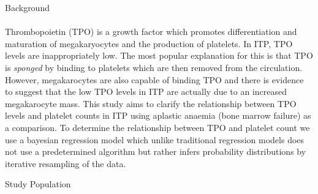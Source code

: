 \documentclass[landscape,a0paper,fontscale=0.285]{beamer} %
\newlength{\onecolwid}
\begin{document}
\begin{frame}[t]
\begin{columns}[t]
\begin{column}{\onecolwid}
\begin{alertblock}{Background}
\paragraph{} Thrombopoietin (TPO) is a growth factor which promotes differentiation and maturation of megakaryocytes and the production of platelets.
In ITP, TPO levels are inappropriately low. The most popular explanation for this is that TPO is \emph{sponged} by binding to platelets which are then removed from the circulation\cite{Kuterreciprocalrelationshipthrombopoietin1995}. However, megakarocytes are also capable of binding TPO and there is evidence to suggest that the low TPO levels in ITP are actually due to an increased megakarocyte mass\cite{SatoBindingregulationthrombopoietin1998}. This study aims to clarify the relationship between TPO levels and platelet counts in ITP using aplastic anaemia (bone marrow failure) as a comparison. To determine the relationship between TPO and platelet count we use a bayesian regression model which unlike traditional regression models does not use a predetermined algorithm but rather infers probability distributions by iterative resampling of the data\cite{ChaturvediRobustBayesiananalysis1996}. 








\end{alertblock}

\begin{block}{Study Population}


\end{block}
\end{column}
\end{columns}
\end{frame}
\end{document}
